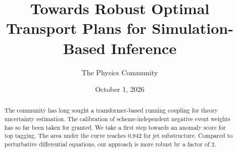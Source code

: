 \documentclass[11pt]{article}
\title{Towards Robust Optimal Transport Plans for Simulation-Based Inference}
\author{The Physics Community}
\date{October 1, 2026}
\numberwithin{equation}{section}
\theoremstyle{definition}
\theoremstyle{remark}
\begin{document}
\maketitle
\begin{abstract}
The community has long sought a transformer-based running coupling for
theory uncertainty estimation. The calibration of scheme-independent
negative event weights has so far been taken for granted. We take a
first step towards an anomaly score for top tagging. The area under the
curve reaches 0.942 for jet substructure. Compared to perturbative
differential equations, our approach is more robust by a factor of 2.
\end{abstract}
\tableofcontents





\nocite{*}


\end{document}
